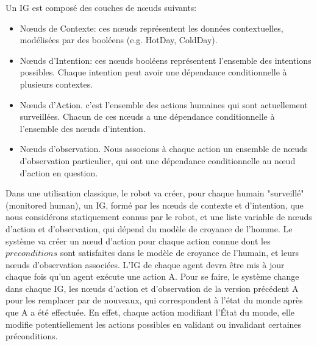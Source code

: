 \documentclass[a4paper,11pt,twoside]{StyleThese}
\begin{document}
Un IG est composé des couches de nœuds suivants:
\begin{itemize}
\item Nœuds de Contexte: ces nœuds représentent les données contextuelles, modélisées par des booléens (e.g. HotDay, ColdDay).
\item Nœuds d'Intention: ces nœuds booléens représentent l'ensemble des intentions possibles. Chaque intention peut avoir une dépendance conditionnelle à plusieurs contextes.
\item Nœuds d'Action. c'est l'ensemble des actions humaines qui sont actuellement surveillées. Chacun de ces nœuds a une dépendance conditionnelle à l'ensemble des nœuds d'intention.
\item Nœuds d'observation. Nous associons à chaque action un ensemble de nœuds d'observation particulier, qui ont une dépendance conditionnelle au nœud d'action en question. 
\end{itemize}


Dans une utilisation classique, le robot va créer, pour chaque humain "surveillé" (monitored human), un IG, formé par les nœuds de contexte et d'intention, que nous considérons statiquement connus par le robot, et une liste variable de nœuds d'action et d'observation, qui dépend du modèle de croyance de l'homme. Le système va créer un nœud d'action pour chaque action connue dont les  $preconditions$ sont satisfaites dans le modèle de croyance de l'humain, et leurs nœuds d'observation associées. L'IG de chaque agent devra être mis à jour chaque fois qu'un agent exécute une action A. Pour se faire, le système change dans chaque IG, les nœuds d'action et d'observation de la version précédent A pour les remplacer par de nouveaux, qui correspondent à l'état du monde après que A a été effectuée. En effet, chaque action modifiant l'État du monde, elle modifie potentiellement les actions possibles en validant ou invalidant certaines préconditions.
\end{document}
